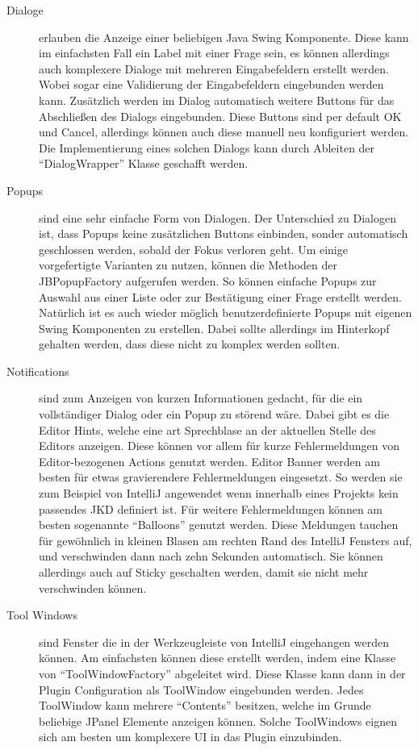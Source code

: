   \begin{description}
    \item[Dialoge] erlauben die Anzeige einer beliebigen Java Swing Komponente. 
      Diese kann im einfachsten Fall ein Label mit einer Frage sein, es können allerdings
      auch komplexere Dialoge mit mehreren Eingabefeldern erstellt werden. Wobei
      sogar eine Validierung der Eingabefeldern eingebunden werden kann. Zusätzlich
      werden im Dialog automatisch weitere Buttons für das Abschließen des Dialogs 
      eingebunden. Diese Buttons sind per default OK und Cancel, allerdings können auch
      diese manuell neu konfiguriert werden. Die Implementierung eines solchen Dialogs
      kann durch Ableiten der \enquote{DialogWrapper} Klasse geschafft werden.
    \item[Popups] sind eine sehr einfache Form von Dialogen. Der Unterschied zu Dialogen
      ist, dass Popups keine zusätzlichen Buttons einbinden, sonder automatisch 
      geschlossen werden, sobald der Fokus verloren geht. Um einige vorgefertigte 
      Varianten zu nutzen, können die Methoden der JBPopupFactory aufgerufen werden.
      So können einfache Popups zur Auswahl aus einer Liste oder zur Bestätigung einer
      Frage erstellt werden. Natürlich ist es auch wieder möglich benutzerdefinierte
      Popups mit eigenen Swing Komponenten zu erstellen. Dabei sollte allerdings im
      Hinterkopf gehalten werden, dass diese nicht zu komplex werden sollten.
    \item[Notifications] sind zum Anzeigen von kurzen Informationen gedacht, für die
      ein vollständiger Dialog oder ein Popup zu störend wäre. Dabei gibt es die 
      Editor Hints, welche eine art Sprechblase an der aktuellen Stelle des Editors
      anzeigen. Diese können vor allem für kurze Fehlermeldungen von Editor-bezogenen
      Actions genutzt werden. Editor Banner werden am besten für etwas gravierendere
      Fehlermeldungen eingesetzt. So werden sie zum Beispiel von IntelliJ angewendet
      wenn innerhalb eines Projekts kein passendes JKD definiert ist. Für weitere
      Fehlermeldungen können am besten sogenannte \enquote{Balloons} genutzt werden.
      Diese Meldungen tauchen für gewöhnlich in kleinen Blasen am rechten Rand
      des IntelliJ Fensters auf, und verschwinden dann nach zehn Sekunden automatisch.
      Sie können allerdings auch auf Sticky geschalten werden, damit sie nicht mehr
      verschwinden können.
    \item[Tool Windows] sind Fenster die in der Werkzeugleiste von IntelliJ eingehangen
      werden können. Am einfachsten können diese erstellt werden, indem eine Klasse
      von \enquote{ToolWindowFactory} abgeleitet wird. Diese Klasse kann dann 
      in der Plugin Configuration als ToolWindow eingebunden werden. Jedes ToolWindow
      kann mehrere \enquote{Contents} besitzen, welche im Grunde beliebige JPanel 
      Elemente anzeigen können. Solche ToolWindows eignen sich am besten um komplexere
      UI in das Plugin einzubinden.
  \end{description}

